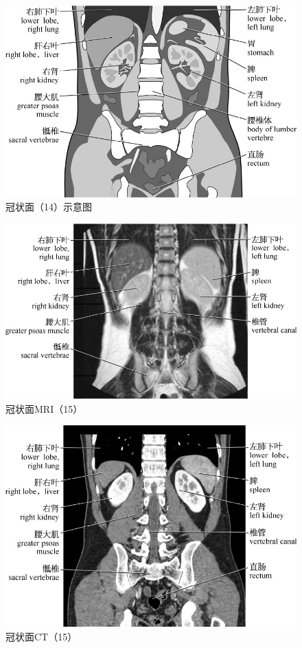 \begin{figure}[!htbp]
 \centering
 \includegraphics{./images/Image00133.jpg}
 \captionsetup{justification=centering}
 \caption{冠状面（14）示意图}
  \end{figure} 
 \FloatBarrier

\begin{figure}[!htbp]
 \centering
 \includegraphics{./images/Image00134.jpg}
 \captionsetup{justification=centering}
 \caption{冠状面MRI（15）}
  \end{figure} 
 \FloatBarrier

\begin{figure}[!htbp]
 \centering
 \includegraphics{./images/Image00135.jpg}
 \captionsetup{justification=centering}
 \caption{冠状面CT（15）}
  \end{figure} 
 \FloatBarrier

